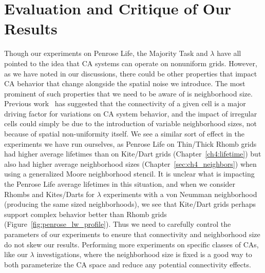 \documentclass[a4paper,11pt,twoside]{report}
\begin{document}
\section{Evaluation and Critique of Our Results}

Though our experiments on Penrose Life, the Majority Task and $\lambda$ have all pointed to the idea that CA systems can operate on nonuniform grids. However, as we have noted in our discussions, there could be other properties that impact CA behavior that change alongside the spatial noise we introduce. The most prominent of such properties that we need to be aware of is neighborhood size. Previous work~\cite{fl01} has suggested that the connectivity of a given cell is a major driving factor for variations on CA system behavior, and the impact of irregular cells could simply be due to the introduction of variable neighborhood sizes, not because of spatial non-uniformity itself. We see a similar sort of effect in the experiments we have run ourselves, as Penrose Life on Thin/Thick Rhomb grids had higher average lifetimes than on Kite/Dart grids (Chapter~\ref{ch4:lifetime}) but also had higher average neighborhood sizes (Chapter~\ref{sec:ch4_neighbors}) when using a generalized Moore neighborhood stencil. It is unclear what is impacting the Penrose Life average lifetimes in this situation, and when we consider Rhombs and Kites/Darts for $\lambda$ experiments with a von Neumman neighborhood (producing the same sized neighborhoods), we see that Kite/Dart grids perhaps support complex behavior better than Rhomb grids (Figure~\ref{fig:penrose_lw_profile}). Thus we need to carefully control the parameters of our experiments to ensure that connectivity and neighborhood size do not skew our results. Performing more experiments on specific classes of CAs, like our $\lambda$ investigations, where the neighborhood size is fixed is a good way to both parameterize the CA space and reduce any potential connectivity effects.
\end{document}
